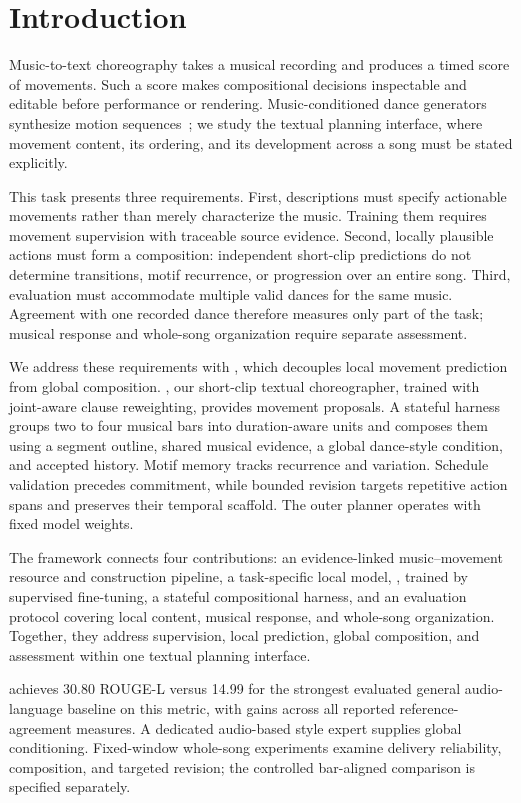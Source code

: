\section{Introduction}
\label{sec:introduction}
Music-to-text choreography takes a musical recording and produces a
timed score of movements. Such a score makes compositional decisions
inspectable and editable before performance or rendering. Music-conditioned
dance generators synthesize motion sequences~\cite{aistpp,bailando,edge};
we study the textual planning interface, where movement content, its
ordering, and its development across a song must be stated explicitly.

This task presents three requirements. First, descriptions must specify
actionable movements rather than merely characterize the music. Training
them requires movement supervision with traceable source evidence.
Second, locally plausible actions must form a composition: independent
short-clip predictions do not determine transitions, motif recurrence,
or progression over an entire song. Third, evaluation must accommodate
multiple valid dances for the same music. Agreement with one recorded
dance therefore measures only part of the task; musical response and
whole-song organization require separate assessment.

We address these requirements with \method, which decouples local movement
prediction from global composition. \captioner, our short-clip textual choreographer,
trained with joint-aware clause reweighting, provides movement proposals.
A stateful harness groups two to four musical bars
into duration-aware units and composes them using a segment outline,
shared musical evidence, a global dance-style condition, and accepted
history. Motif memory tracks recurrence and variation. Schedule validation
precedes commitment, while bounded revision targets repetitive action
spans and preserves their temporal scaffold. The outer planner operates
with fixed model weights.

The framework connects four contributions: an evidence-linked
music--movement resource and construction pipeline, a task-specific
local model, \captioner, trained by supervised fine-tuning, a stateful compositional
harness, and an evaluation protocol covering local content, musical
response, and whole-song organization. Together, they address supervision,
local prediction, global composition, and assessment within one textual
planning interface.

\captioner achieves 30.80 ROUGE-L versus 14.99 for the strongest
evaluated general audio-language baseline on this metric, with gains
across all reported reference-agreement measures. A dedicated audio-based
style expert supplies global conditioning. Fixed-window whole-song
experiments examine delivery reliability, composition, and targeted
revision; the controlled bar-aligned comparison is specified separately.


